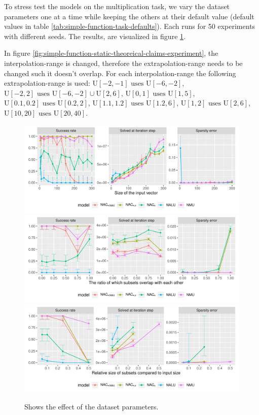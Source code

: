 To stress test the models on the multiplication task, we vary the dataset parameters one at a time while keeping the others at their default value (default values in table \ref{tab:simple-function-task-defaults}). Each runs for 50 experiments with different seeds. The results, are visualized in figure \ref{fig:simple-function-static-dataset-parameters-boundary}.

In figure \ref{fig:simple-function-static-theoreical-claims-experiment}, the interpolation-range is changed, therefore the extrapolation-range needs to be changed such it doesn't overlap. For each interpolation-range the following extrapolation-range is used: ${\mathrm{U}[-2,-1] \text{ uses } \mathrm{U}[-6,-2]}$, ${\mathrm{U}[-2,2] \text{ uses } \mathrm{U}[-6,-2] \cup \mathrm{U}[2,6]}$, ${\mathrm{U}[0,1] \text{ uses } \mathrm{U}[1,5]}$, ${\mathrm{U}[0.1,0.2] \text{ uses } \mathrm{U}[0.2,2]}$, ${\mathrm{U}[1.1,1.2] \text{ uses } \mathrm{U}[1.2,6]}$, ${\mathrm{U}[1,2] \text{ uses } \mathrm{U}[2,6]}$, ${\mathrm{U}[10, 20] \text{ uses } \mathrm{U}[20, 40]}$.

\begin{figure}[h]
\centering
\includegraphics[width=\linewidth,trim={0 1.3cm 0 0},clip]{results/simple_function_static_mul_input_size.pdf}
\includegraphics[width=\linewidth,trim={0 1.3cm 0 0.809cm},clip]{results/simple_function_static_mul_overlap.pdf}
\includegraphics[width=\linewidth,trim={0 0 0 0.809cm},clip]{results/simple_function_static_mul_subset.pdf}
\caption{Shows the effect of the dataset parameters.}
\label{fig:simple-function-static-dataset-parameters-boundary}
\end{figure}

